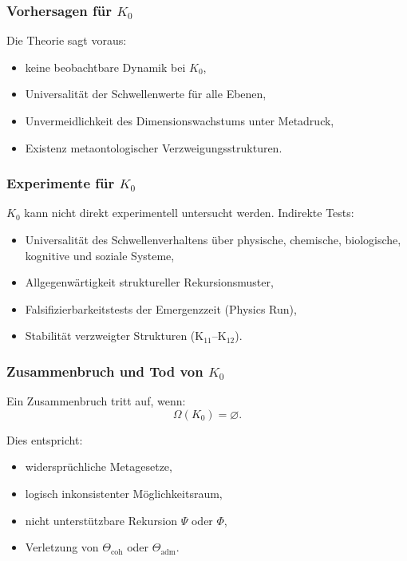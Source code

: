 \subsubsection{Vorhersagen für \texorpdfstring{$K_0$}{K_0}}

Die Theorie sagt voraus:
\begin{itemize}
    \item keine beobachtbare Dynamik bei $K_0$,
    \item Universalität der Schwellenwerte für alle Ebenen,
    \item Unvermeidlichkeit des Dimensionswachstums unter Metadruck,
    \item Existenz metaontologischer Verzweigungsstrukturen.
\end{itemize}

\subsubsection{Experimente für \texorpdfstring{$K_0$}{K_0}}

$K_0$ kann nicht direkt experimentell untersucht werden.
Indirekte Tests:
\begin{itemize}
    \item Universalität des Schwellenverhaltens über physische,
          chemische, biologische, kognitive und soziale Systeme,
    \item Allgegenwärtigkeit struktureller Rekursionsmuster,
    \item Falsifizierbarkeitstests der Emergenzzeit (Physics Run),
    \item Stabilität verzweigter Strukturen (K$_{11}$–K$_{12}$).
\end{itemize}

\subsubsection{Zusammenbruch und Tod von \texorpdfstring{$K_0$}{K_0}}

Ein Zusammenbruch tritt auf, wenn:
\[
\Omega(K_0) = \varnothing.
\]

Dies entspricht:
\begin{itemize}
    \item widersprüchliche Metagesetze,
    \item logisch inkonsistenter Möglichkeitsraum,
    \item nicht unterstützbare Rekursion $\Psi$ oder $\Phi$,
    \item Verletzung von $\Theta_{\mathrm{coh}}$ oder $\Theta_{\mathrm{adm}}$.
\end{itemize}


